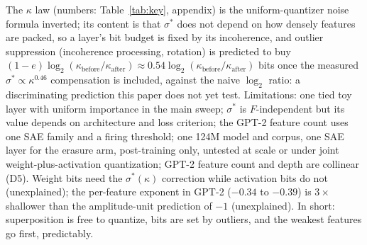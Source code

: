\documentclass{article}
\makeatletter
\renewcommand\section{\@startsection{section}{1}{\z@}{-1.0ex \@plus -0.3ex \@minus -0.2ex}{0.5ex \@plus 0.1ex}{\large\bfseries\raggedright}}
\makeatother
\begin{document}
\section{Conclusion}

The $\kappa$ law (numbers: Table~\ref{tab:key}, appendix) is the uniform-quantizer noise formula inverted; its content is
that $\sigma^*$ does not depend on how densely features are packed, so a layer's bit budget is fixed by its incoherence,
and outlier suppression (incoherence processing, rotation) is predicted to buy
$(1-e)\log_2(\kappa_{\mathrm{before}}/\kappa_{\mathrm{after}})\approx0.54\log_2(\kappa_{\mathrm{before}}/\kappa_{\mathrm{after}})$
bits once the measured $\sigma^*\propto\kappa^{0.46}$ compensation is included, against the naive $\log_2$ ratio: a
discriminating prediction this paper does not yet test.
Limitations: one tied toy layer with uniform importance in the main sweep; $\sigma^*$ is $F$-independent but its value
depends on architecture and loss criterion; the GPT-2 feature count uses one SAE family and a firing threshold; one 124M model and corpus, one SAE layer for the erasure arm, post-training only, untested at scale or under joint weight-plus-activation
quantization; GPT-2 feature count and depth are collinear (D5). Weight bits need the $\sigma^*(\kappa)$ correction while activation bits do not (unexplained); the
per-feature exponent in GPT-2 ($-0.34$ to $-0.39$) is $3\times$ shallower than the amplitude-unit prediction of $-1$
(unexplained). In short: superposition is free to quantize, bits are set by outliers, and the weakest features
go first, predictably.
\end{document}
